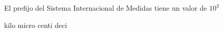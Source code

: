 
\question El prefijo \fillin \enspace del Sistema Internacional de Medidas
tiene un valor de $10^3$

  \begin{oneparchoices}
    \CorrectChoice kilo
    \choice micro
    \choice centi
    \choice deci
  \end{oneparchoices}
  \answerline[A]
